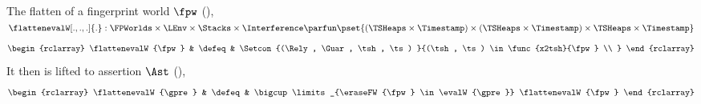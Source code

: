 \begin{defn}
The flatten of a fingerprint world \( \fpw \) (), \( \flattenevalW[.,.,.]{.} : \FPWorlds \times \LEnv \times \Stacks \times \Interference \parfun \pset{(\TSHeaps \times \Timestamp) \times (\TSHeaps \times \Timestamp) \times \TSHeaps \times \Timestamp}\)
\[
\begin{rclarray}
    \flattenevalW{\fpw} & \defeq & \Setcon{%
        (\Rely, \Guar, \tsh, \ts)
    }{%
        (\tsh, \ts) \in \func{x2tsh}{\fpw}  \\
    }
\end{rclarray}
\]
It then is lifted to assertion \( \Ast \) (),
\[
\begin{rclarray}
    \flattenevalW{\gpre} & \defeq &
    \bigcup\limits_{\eraseFW{\fpw} \in \evalW{\gpre}}  \flattenevalW{\fpw}
\end{rclarray}
\]
\end{defn}




